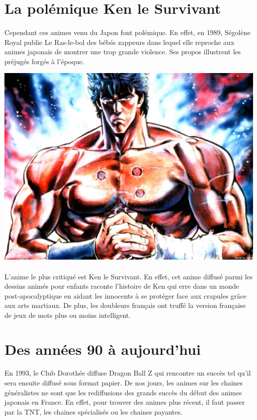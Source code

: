 \section{La polémique Ken le Survivant}
\paragraph{}
Cependant ces animes venu du Japon font polémique. En effet, en 1989, Ségolène Royal publie Le Ras-le-bol des bébés zappeurs dans lequel elle reproche aux animes japonais de montrer une trop grande violence. Ses propos illustrent les préjugés forgés à l’époque. 
\begin{center}
\includegraphics[scale=0.15]{ken.jpg}
\end{center}
\paragraph{}
L’anime le plus critiqué est Ken le Survivant. En effet, cet anime diffusé parmi les dessins animés pour enfants raconte l’histoire de Ken qui erre dans un monde post-apocalyptique en aidant les innocents à se protéger face aux crapules grâce aux arts martiaux. De plus, les doubleurs français ont truffé la version française de jeux de mots plus ou moins intelligent.

\section{Des années 90 à aujourd'hui}
\paragraph{}
En 1993, le Club Dorothée diffuse Dragon Ball Z qui rencontre un  succès tel qu’il sera ensuite diffusé sous format papier. De nos jours, les animes sur les chaines généralistes ne sont que les rediffusions des grands succès du début des animes japonais en France.  En effet, pour trouver des animes plus récent, il faut passer par la TNT, les chaines spécialisés ou les chaines payantes. 


